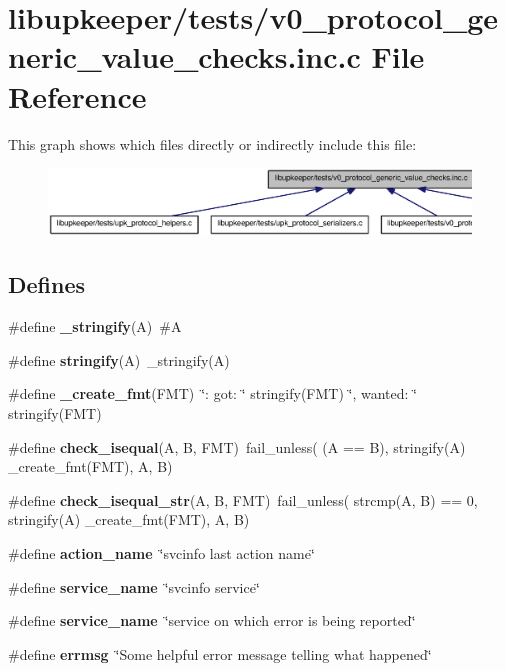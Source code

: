 \section{libupkeeper/tests/v0\_\-protocol\_\-generic\_\-value\_\-checks.inc.c File Reference}
\label{v0__protocol__generic__value__checks_8inc_8c}
This graph shows which files directly or indirectly include this file:\nopagebreak
\begin{figure}[H]
\begin{center}
\leavevmode
\includegraphics[width=400pt]{v0__protocol__generic__value__checks_8inc_8c__dep__incl}
\end{center}
\end{figure}
\subsection*{Defines}
\begin{DoxyCompactItemize}
\item 
\#define {\bf \_\-stringify}(A)~\#A
\item 
\#define {\bf stringify}(A)~\_\-stringify(A)
\item 
\#define {\bf \_\-create\_\-fmt}(FMT)~\char`\"{}: got: \char`\"{} stringify(FMT) \char`\"{}, wanted: \char`\"{} stringify(FMT)
\item 
\#define {\bf check\_\-isequal}(A, B, FMT)~fail\_\-unless( (A == B), stringify(A) \_\-create\_\-fmt(FMT), A, B)
\item 
\#define {\bf check\_\-isequal\_\-str}(A, B, FMT)~fail\_\-unless( strcmp(A, B) == 0, stringify(A) \_\-create\_\-fmt(FMT), A, B)
\item 
\#define {\bf action\_\-name}~\char`\"{}svcinfo last action name\char`\"{}
\item 
\#define {\bf service\_\-name}~\char`\"{}svcinfo service\char`\"{}
\item 
\#define {\bf service\_\-name}~\char`\"{}service on which error is being reported\char`\"{}
\item 
\#define {\bf errmsg}~\char`\"{}Some helpful error message telling what happened\char`\"{}
\end{DoxyCompactItemize}
